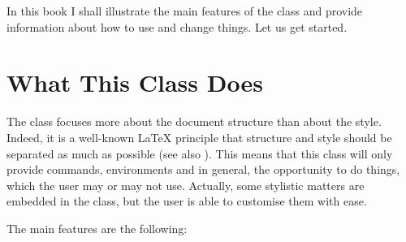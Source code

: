 In this book I shall illustrate the main features of the class and 
provide information about how to use and change things. Let us get 
started.

\section{What This Class Does}
\label{does}

The  class focuses more about the document structure than 
about the style. Indeed, it is a well-known \LaTeX\xspace principle that 
structure and style should be separated as much as possible (see also 
). This means that this class will only provide 
commands, environments and in general, the opportunity to do things, 
which the user may or may not use. Actually, some stylistic matters are 
embedded in the class, but the user is able to customise them with ease.

The main features are the following:

